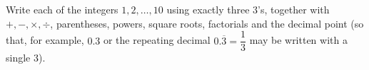 Write each of the integers $1,2,\dots,10$ using exactly three $3$'s, together with $+,-,\times,\div$, parentheses, powers, square roots, factorials and the decimal point (so that, for example, $0.3$ or the repeating decimal $0.\overline{3}=\dfrac13$ may be written with a single $3$).
